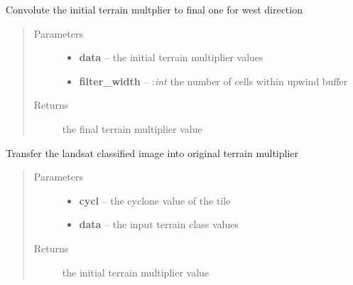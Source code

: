 \documentclass[letterpaper,10pt,english]{sphinxmanual}
\begin{document}

\begin{fulllineitems}
\label{docs/terrain:terrain_mult.convo_w}
Convolute the initial terrain multplier to final one for west direction
\begin{quote}\begin{description}
\item[{Parameters}] \leavevmode\begin{itemize}
\item {} 
\textbf{data} --  the initial terrain multiplier values

\item {} 
\textbf{filter\_width} -- :\emph{int} the number of cells within upwind buffer

\end{itemize}

\item[{Returns}] \leavevmode
{} the final terrain multiplier value

\end{description}\end{quote}

\end{fulllineitems}



\begin{fulllineitems}
\label{docs/terrain:terrain_mult.tc2mz_orig}
Transfer the landsat classified image into original terrain multiplier
\begin{quote}\begin{description}
\item[{Parameters}] \leavevmode\begin{itemize}
\item {} 
\textbf{cycl} --  the cyclone value of the tile

\item {} 
\textbf{data} --  the input terrain class values

\end{itemize}

\item[{Returns}] \leavevmode
{} the initial terrain multiplier value

\end{description}\end{quote}

\end{fulllineitems}
\end{document}
